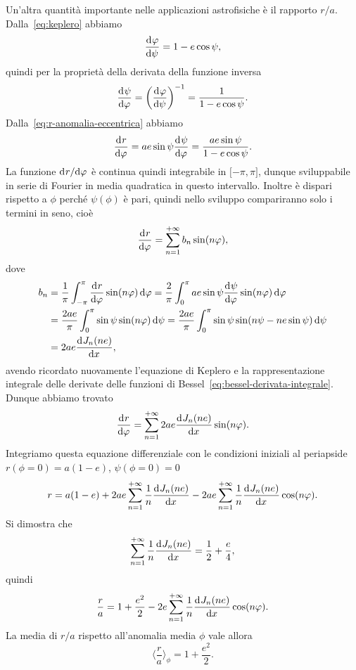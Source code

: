 Un'altra quantità importante nelle applicazioni astrofisiche è il rapporto
$r/a$. Dalla~\eqref{eq:keplero} abbiamo
\begin{equation}
  \frac{{\mathop{}\!\mathrm{d}^{}}\varphi}{\mathop{}\!\mathrm{d} {\psi}^{}} = 1 -e\cos\psi,
\end{equation}
quindi per la proprietà della derivata della funzione inversa
\begin{equation}
  \frac{{\mathop{}\!\mathrm{d}^{}}\psi}{\mathop{}\!\mathrm{d} {\varphi}^{}} =
  \left(
    \frac{{\mathop{}\!\mathrm{d}^{}}\varphi}{\mathop{}\!\mathrm{d} {\psi}^{}}
  \right)^{-1} = \frac{1}{1 - e\cos\psi}.
\end{equation}
Dalla~\eqref{eq:r-anomalia-eccentrica} abbiamo
\begin{equation}
  \frac{{\mathop{}\!\mathrm{d}^{}}r}{\mathop{}\!\mathrm{d} {\varphi}^{}} = ae\sin\psi\frac{{\mathop{}\!\mathrm{d}^{}}\psi}{\mathop{}\!\mathrm{d} {\varphi}^{}} = \frac{ae\sin\psi}{1-e\cos\psi}.
\end{equation}
La funzione $\mathrm{d}^{}r / \mathrm{d} {\varphi}^{}$ è continua quindi integrabile in $\mathopen{[}-\pi,
\pi\mathclose{]}$, dunque sviluppabile in serie di Fourier in media quadratica
in questo intervallo. Inoltre è dispari rispetto a $\phi$ perché $\psi(\phi)$ è
pari, quindi nello sviluppo compariranno solo i termini in seno, cioè
\begin{equation}
  \frac{{\mathop{}\!\mathrm{d}^{}}r}{\mathop{}\!\mathrm{d} {\varphi}^{}} = \sum_{n=1}^{+\infty}b_n\sin(n\varphi),
\end{equation}
dove
\begin{equation}
  \begin{split}
    b_n &= \frac{1}{\pi}\int_{-\pi}^\pi \toder{r}{\phi}\sin(n\phi)\dd\phi =
    \frac{2}{\pi}\int_0^\pi ae\sin\psi\toder{\psi}{\phi}\sin(n\phi)\dd\phi \\
    &= \frac{2ae}{\pi}\int_0^\pi \sin\psi\sin(n\phi)\dd\psi = \frac{2ae}{\pi}
    \int_0^\pi \sin\psi\sin(n\psi - ne\sin\psi)\dd\psi \\
    &= 2ae\toder{J_n(ne)}{x},
  \end{split}
\end{equation}
avendo ricordato nuovamente l'equazione di Keplero e la rappresentazione
integrale delle derivate delle funzioni di
Bessel~\eqref{eq:bessel-derivata-integrale}. Dunque abbiamo trovato
\begin{equation}
  \frac{{\mathop{}\!\mathrm{d}^{}}r}{\mathop{}\!\mathrm{d} {\varphi}^{}} = \sum_{n=1}^{+\infty} 2ae\frac{{\mathop{}\!\mathrm{d}^{}}J_n(ne)}{\mathop{}\!\mathrm{d} {x}^{}}\sin(n\varphi).
\end{equation}
Integriamo questa equazione differenziale con le condizioni iniziali al
periapside $r(\phi=0) = a(1-e)$, $\psi(\phi=0)=0$
\begin{equation}
  r = a(1-e) + 2ae\sum_{n=1}^{+\infty}\frac{1}{n}\frac{{\mathop{}\!\mathrm{d}^{}}J_n(ne)}{\mathop{}\!\mathrm{d} {x}^{}} -
  2ae\sum_{n=1}^{+\infty}\frac{1}{n}\frac{{\mathop{}\!\mathrm{d}^{}}J_n(ne)}{\mathop{}\!\mathrm{d} {x}^{}}\cos(n\varphi).
\end{equation}
Si dimostra che
\begin{equation}
  \sum_{n=1}^{+\infty}\frac{1}{n}\frac{{\mathop{}\!\mathrm{d}^{}}J_n(ne)}{\mathop{}\!\mathrm{d} {x}^{}} = \frac{1}{2} + \frac{e}{4},
\end{equation}
quindi
\begin{equation}
  \frac{r}{a} = 1 + \frac{e^2}{2} - 2e \sum_{n=1}^{+\infty} \frac{1}{n}
  \frac{{\mathop{}\!\mathrm{d}^{}}J_n(ne)}{\mathop{}\!\mathrm{d} {x}^{}} \cos(n\varphi).
\end{equation}
La media di $r/a$ rispetto all'anomalia media $\phi$ vale allora
\begin{equation}
  \langle \frac{r}{a} \rangle_\phi = 1 + \frac{e^2}{2}.
\end{equation}

